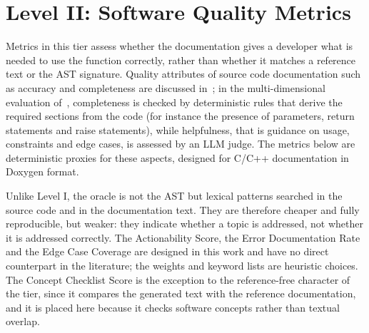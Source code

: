 \section{Level II: Software Quality Metrics}
\label{sec:metrics-level2}
Metrics in this tier assess whether the documentation gives a developer what is needed to use the
function correctly, rather than whether it matches a reference text or the AST signature. Quality
attributes of source code documentation such as accuracy and completeness are discussed
in~\cite{rai_review_2022}; in the multi-dimensional evaluation of~\cite{yang_docagent_2025},
completeness is checked by deterministic rules that derive the required sections from the code (for
instance the presence of parameters, return statements and raise statements), while helpfulness,
that is guidance on usage, constraints and edge cases, is assessed by an LLM judge. The metrics
below are deterministic proxies for these aspects, designed for C/C++ documentation in Doxygen
format.

Unlike Level I, the oracle is not the AST but lexical patterns searched in the source code and in
the documentation text. They are therefore cheaper and fully reproducible, but weaker: they
indicate whether a topic is addressed, not whether it is addressed correctly. The Actionability
Score, the Error Documentation Rate and the Edge Case Coverage are designed in this work and have no
direct counterpart in the literature; the weights and keyword lists are heuristic choices. The
Concept Checklist Score is the exception to the reference-free character of the tier, since it
compares the generated text with the reference documentation, and it is placed here because it
checks software concepts rather than textual overlap.

